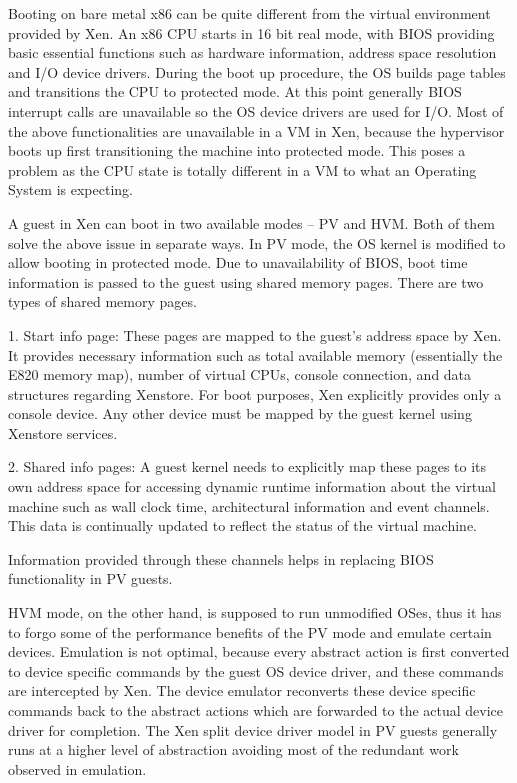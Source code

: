 Booting on bare metal x86 can be quite different from the virtual environment provided by Xen. An x86 CPU starts in 16 bit real mode, with BIOS providing basic essential functions such as hardware information, address space resolution and I/O device drivers. During the boot up procedure, the OS builds page tables and transitions the CPU to protected mode. At this point generally BIOS interrupt calls are unavailable so the OS device drivers are used for I/O. Most of the above functionalities are unavailable in a VM in Xen, because the hypervisor boots up first transitioning the machine into protected mode. This poses a problem as the CPU state is totally different in a VM to what an Operating System is expecting.

A guest in Xen can boot in two available modes – PV and HVM. Both of them solve the above issue in separate ways. In PV mode, the OS kernel is modified to allow booting in protected mode. Due to unavailability of BIOS, boot time information is passed to the guest using shared memory pages. There are two types of shared memory pages.

1. Start info page: These pages are mapped to the guest’s address space by Xen. It provides necessary information such as total available memory (essentially the E820 memory map), number of virtual CPUs, console connection, and data structures regarding Xenstore. For boot purposes, Xen explicitly provides only a console device. Any other device must be mapped by the guest kernel using Xenstore services.

2. Shared info pages: A guest kernel needs to explicitly map these pages to its own address space for accessing dynamic runtime information about the virtual machine such as wall clock time, architectural information and event channels. This data is continually updated to reflect the status of the virtual machine.

Information provided through these channels helps in replacing BIOS functionality in PV guests.

HVM mode, on the other hand, is supposed to run unmodified OSes, thus it has to forgo some of the performance benefits of the PV mode and emulate certain devices. Emulation is not optimal, because every abstract action is first converted to device specific commands by the guest OS device driver, and these commands are intercepted by Xen. The device emulator reconverts these device specific commands back to the abstract actions which are forwarded to the actual device driver for completion. The Xen split device driver model in PV guests generally runs at a higher level of abstraction avoiding most of the redundant work observed in emulation.

